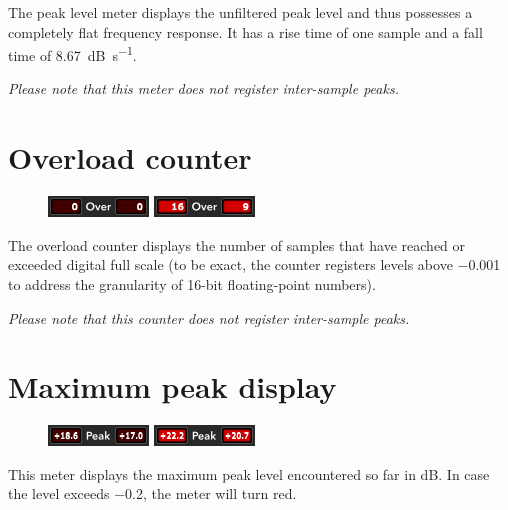 The peak level meter displays the unfiltered peak level and thus
possesses a completely flat frequency response.  It has a rise time of
one sample and a fall time of \SI{8.67}{\dB\per\second}.

\emph{Please note that this meter does not register inter-sample
  peaks.}

\section{Overload counter}

\begin{figure}
\includegraphics[scale=\screenshotscale,clip]{include/images/overload_counter_normal.png}
\newline
\includegraphics[scale=\screenshotscale,clip]{include/images/overload_counter_clipped.png}
\end{figure}

The overload counter displays the number of samples that have reached
or exceeded digital full scale (to be exact, the counter registers
levels above \SI{-0.001}{\dBFS} to address the granularity of
\num{16}-bit floating-point numbers).

\emph{Please note that this counter does not register inter-sample
  peaks.}

\section{Maximum peak display}

\begin{figure}
\includegraphics[scale=\screenshotscale,clip]{include/images/maximum_peak_normal.png}
\newline
\includegraphics[scale=\screenshotscale,clip]{include/images/maximum_peak_clipped.png}
\end{figure}

This meter displays the maximum peak level encountered so far in
\si{\dB}.  In case the level exceeds \SI{-0.2}{\dBFS}, the meter will
turn red.


